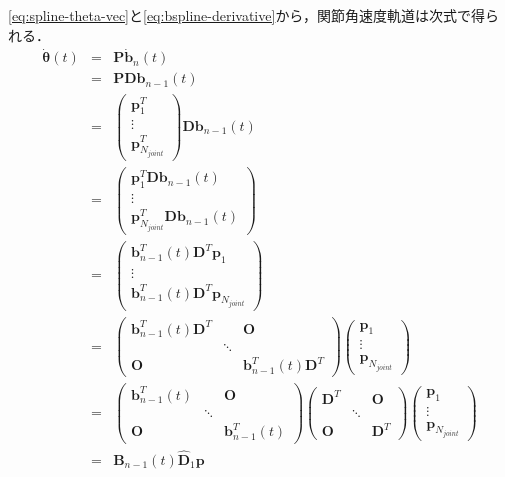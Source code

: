 \eqref{eq:spline-theta-vec}と\eqref{eq:bspline-derivative}から，関節角速度軌道は次式で得られる．
\begin{eqnarray}
  \bm{\dot{\theta}}(t) &=& \bm{P} \bm{\dot{b}}_n(t) \\
  &=& \bm{P} \bm{D} \bm{b}_{n-1}(t) \\
  &=& \begin{pmatrix} \bm{p}_1^T \\ \vdots \\ \bm{p}_{N_{\mathit{joint}}}^T \end{pmatrix} \bm{D} \bm{b}_{n-1}(t) \\
  &=& \begin{pmatrix} \bm{p}_1^T \bm{D} \bm{b}_{n-1}(t) \\ \vdots \\ \bm{p}_{N_{\mathit{joint}}}^T \bm{D} \bm{b}_{n-1}(t) \end{pmatrix} \\
  &=& \begin{pmatrix} \bm{b}_{n-1}^T(t) \bm{D}^T \bm{p}_1 \\ \vdots \\ \bm{b}_{n-1}^T(t) \bm{D}^T \bm{p}_{N_{\mathit{joint}}} \end{pmatrix} \\
  &=& \begin{pmatrix} \bm{b}_{n-1}^T(t) \bm{D}^T && \bm{O} \\ &\ddots& \\ \bm{O} && \bm{b}_{n-1}^T(t) \bm{D}^T \end{pmatrix} \begin{pmatrix} \bm{p}_1 \\ \vdots \\ \bm{p}_{N_{\mathit{joint}}} \end{pmatrix} \\
  &=& \begin{pmatrix} \bm{b}_{n-1}^T(t) && \bm{O} \\ &\ddots& \\ \bm{O} && \bm{b}_{n-1}^T(t) \end{pmatrix} \begin{pmatrix} \bm{D}^T && \bm{O} \\ &\ddots& \\ \bm{O} && \bm{D}^T \end{pmatrix} \begin{pmatrix} \bm{p}_1 \\ \vdots \\ \bm{p}_{N_{\mathit{joint}}} \end{pmatrix} \\
  &=& \bm{B}_{n-1}(t) \bm{\hat{D}}_1 \bm{p}
\end{eqnarray}
